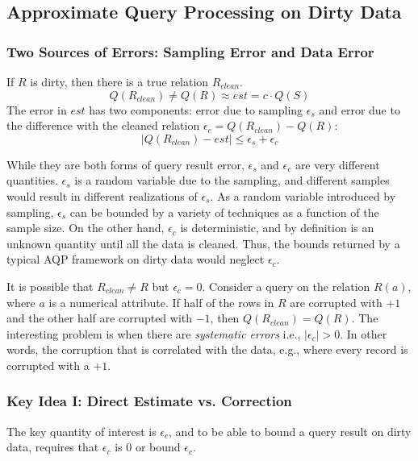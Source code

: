 \subsection{Approximate Query Processing on Dirty Data}


\subsubsection{Two Sources of Errors: Sampling Error and Data Error}
If $R$ is dirty, then there is a true relation $R_{clean}$.
\[
Q(R_{clean}) \ne Q(R) \approx est = c \cdot Q(S)
\]
The error in $est$ has two components: error due to sampling $\epsilon_s$ and error due to the difference with the cleaned relation $\epsilon_c = Q(R_{clean}) - Q(R)$:
\[
\mid Q(R_{clean}) - est \mid \le \epsilon_s + \epsilon_c
\]

While they are both forms of query result error, $\epsilon_s$ and $\epsilon_c$ are very different quantities.
$\epsilon_s$ is a random variable due to the sampling, and different samples would result in different realizations of $\epsilon_s$.
As a random variable introduced by sampling, $\epsilon_s$ can be bounded by a variety of techniques as a function of the sample size.
On the other hand, $\epsilon_c$ is deterministic, and by definition is an unknown quantity until all the data is cleaned.
Thus, the bounds returned by a typical AQP framework on dirty data would neglect $\epsilon_c$.

It is possible that $R_{clean} \ne R$ but $\epsilon_c=0$.
Consider a \sumfunc query on the relation $R(a)$, where $a$ is a numerical attribute.
If half of the rows in $R$ are corrupted with $+1$ and the other half are corrupted with $-1$, then $Q(R_{clean}) = Q(R)$.
The interesting problem is when there are \emph{systematic errors}\cite{taylor1982introduction} i.e., $\mid \epsilon_c \mid > 0$. 
In other words, the corruption that is correlated with the data, e.g., where every record is corrupted with a $+1$.

\subsubsection{Key Idea I: Direct Estimate vs. Correction}
The key quantity of interest is $\epsilon_c$, and to be able to bound
a query result on dirty data, requires that $\epsilon_c$ is 0 or bound $\epsilon_c$.

